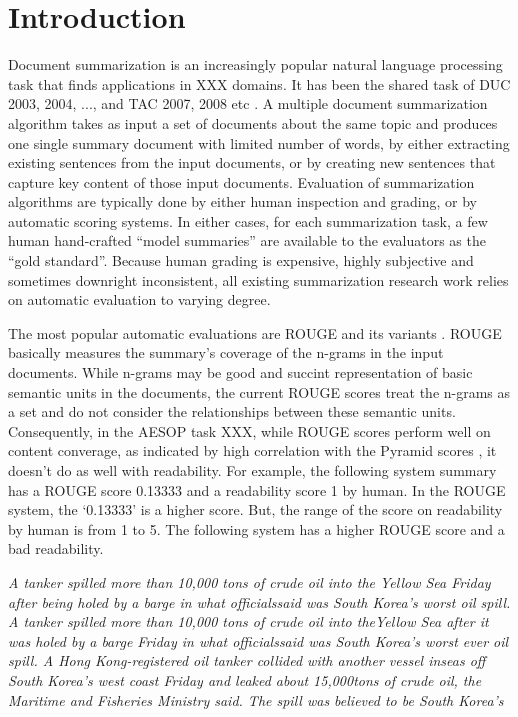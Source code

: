 \section{Introduction}
\label{sec:intro}

Document summarization is an increasingly popular natural language processing
task that finds applications in XXX domains. It has been the shared task of
DUC 2003, 2004, ..., and TAC 2007, 2008 etc \cite{website:DUC,website:TAC}. A multiple document 
summarization algorithm takes as input a set of documents about the same topic
and produces one single summary document with limited number of words, by
either extracting existing sentences from the input documents, or by creating
new sentences that capture key content of those input documents.
Evaluation of summarization algorithms are typically done by either
human inspection and grading, or by automatic scoring systems.  In either
cases, for each summarization task, a few human hand-crafted 
``model summaries'' are available to the 
evaluators as the ``gold standard''. Because human grading is expensive, highly
subjective and sometimes downright inconsistent, all existing summarization 
research work relies on automatic evaluation to varying degree.  

The most popular automatic evaluations are ROUGE and its variants \cite{lin2003automatic,lin2004looking,lin2004rouge}. 
ROUGE basically measures the summary's coverage of the n-grams in the 
input documents. While n-grams may be good and succint representation of
basic semantic units in the documents, the current ROUGE scores treat
the n-grams as a set and do not consider the relationships between these 
semantic units. Consequently, in the AESOP task XXX, while ROUGE scores 
perform well on content converage, as indicated by high correlation with the 
Pyramid scores \cite{nenkova2007pyramid}, it doesn't do as well with readability. 
For example, the following system summary has a ROUGE score 0.13333 and a readability
score 1 by human. In the ROUGE system, the `0.13333' is a higher score. But, the range
of the score on readability by human is from 1 to 5. The following system has a higher
ROUGE score and a bad readability.   

\emph{A tanker spilled more than 10,000 tons of crude oil into the Yellow Sea Friday 
after being holed by a barge in what officialssaid was South Korea's worst oil spill.
A tanker spilled more than 10,000 tons of crude oil into theYellow Sea after it was holed 
by a barge Friday in what officialssaid was South Korea's worst ever oil spill.
A Hong Kong-registered oil tanker collided with another vessel inseas off South Korea's 
west coast Friday and leaked about 15,000tons of crude oil, the Maritime and Fisheries Ministry said.
The spill was believed to be South Korea's}

